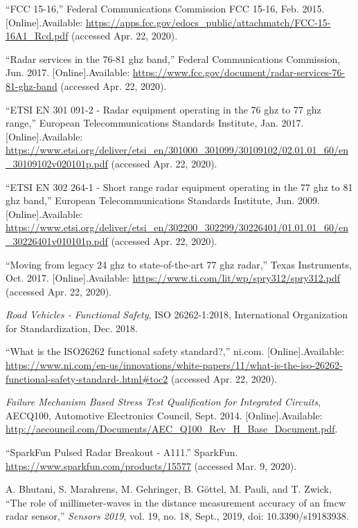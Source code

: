 \documentclass[11pt]{IEEEtran}
\begin{document}
\begin{thebibliography}{00}
			 ``FCC 15-16,'' Federal Communications Commission FCC 15-16, Feb. 2015. [Online].Available: \url{https://apps.fcc.gov/edocs_public/attachmatch/FCC-15-16A1_Rcd.pdf} (accessed Apr. 22, 2020).

			 ``Radar services in the 76-81 ghz band,'' Federal Communications Commission, Jun. 2017. [Online].Available: \url{https://www.fcc.gov/document/radar-services-76-81-ghz-band} (accessed Apr. 22, 2020).

			 ``ETSI EN 301 091-2 - Radar equipment operating in the 76 ghz to 77 ghz range,'' European Telecommunications Standards Institute, Jan. 2017. [Online].Available: \url{https://www.etsi.org/deliver/etsi_en/301000_301099/30109102/02.01.01_60/en_30109102v020101p.pdf} (accessed Apr. 22, 2020).

			 ``ETSI EN 302 264-1 - Short range radar equipment operating in the 77 ghz to 81 ghz band,'' European Telecommunications Standards Institute, Jun. 2009. [Online].Available: \url{https://www.etsi.org/deliver/etsi_en/302200_302299/30226401/01.01.01_60/en_30226401v010101p.pdf} (accessed Apr. 22, 2020).

			 ``Moving from legacy 24 ghz to state-of-the-art 77 ghz radar,'' Texas Instruments, Oct. 2017. [Online].Available: \url{https://www.ti.com/lit/wp/spry312/spry312.pdf} (accessed Apr. 22, 2020).

			 \textit{Road Vehicles - Functional Safety}, ISO 26262-1:2018, International Organization for Standardization, Dec. 2018.

			 ``What is the ISO26262 functional safety standard?,'' ni.com. [Online].Available: \url{https://www.ni.com/en-us/innovations/white-papers/11/what-is-the-iso-26262-functional-safety-standard-.html#toc2} (accessed Apr. 22, 2020).

	    	 \textit{Failure Mechanism Based Stress Test Qualification for Integrated Circuits}, AECQ100, Automotive Electronics Council, Sept. 2014. [Online].Available: \url{http://aecouncil.com/Documents/AEC_Q100_Rev_H_Base_Document.pdf}.


				 ``SparkFun Pulsed Radar Breakout - A111.'' SparkFun. \url{https://www.sparkfun.com/products/15577} (accessed Mar. 9, 2020).

				 A. Bhutani, S. Marahrens, M. Gehringer, B. G{\"o}ttel, M. Pauli, and T. Zwick, ``The role of millimeter-waves in the distance measurement accuracy of an fmcw radar sensor,'' \textit{Sensors 2019}, vol. 19, no. 18, Sept., 2019, doi: 10.3390/s19183938.


\end{thebibliography}
\end{document}
